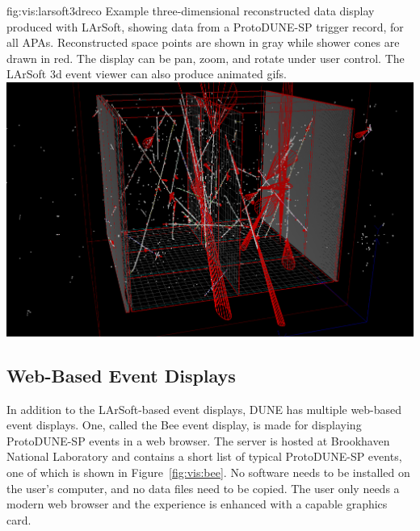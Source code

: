 \documentclass[../main-v1.tex]{subfiles}
\begin{document}
\begin{dunefigure}
{fig:vis:larsoft3dreco} 
{Example three-dimensional reconstructed data display produced with LArSoft, showing data from a ProtoDUNE-SP trigger record, for all APAs.  Reconstructed space points are shown in gray while shower cones are drawn in red.  The display can be pan, zoom, and rotate under user control.  The LArSoft 3d event viewer can also produce animated gifs.}
\includegraphics[width=0.9 \textwidth]{graphics/EventDisplays/larsoft_reco_evd_3d.png}
\end{dunefigure}

\subsection{Web-Based Event Displays}
\label{sec:visualization:web}

In addition to the LArSoft-based event displays, DUNE has multiple web-based event displays.  One, called the Bee event display, is made for displaying ProtoDUNE-SP events in a web browser.  The server is hosted at Brookhaven National Laboratory and contains a short list of typical ProtoDUNE-SP events, one of which is shown in Figure~\ref{fig:vis:bee}. No software needs to be installed on the user's computer, and no data files need to be copied.  The user only needs a modern web browser and the experience is enhanced with a capable graphics card.
\end{document}
